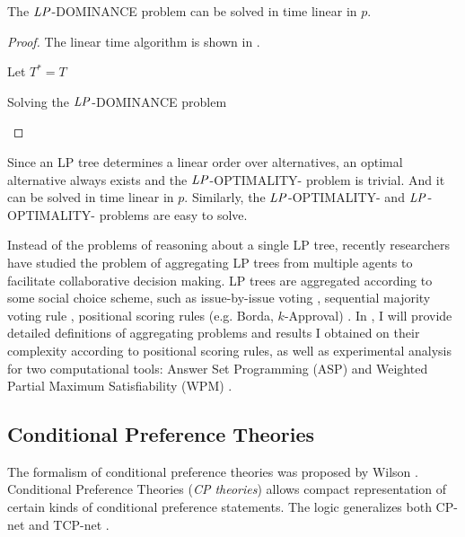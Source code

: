\begin{thm}
\label{thm:LP_DOM}
	The $\mathit{LP}$-DOMINANCE problem can be solved in time linear in $p$.
\end{thm}
\begin{proof}
	The linear time algorithm is shown in .

	\begin{algorithm}[ht]
	Let $T^* = T$\;
	
	\caption{Solving the $\mathit{LP}$-DOMINANCE problem\label{alg:LP_dom}}
	\end{algorithm}
\end{proof}

Since an LP tree determines a linear order over alternatives, an optimal
alternative always exists and the $\mathit{LP}$-OPTIMALITY- problem
is trivial.  And it can be solved in time linear in $p$.
Similarly, the $\mathit{LP}$-OPTIMALITY- and
$\mathit{LP}$-OPTIMALITY- problems are easy to solve.

Instead of the problems of reasoning about a single
LP tree, recently researchers have studied
the problem of aggregating LP trees from multiple
agents to facilitate collaborative decision making.
LP trees are aggregated
according to some social choice scheme, such as
issue-by-issue voting \cite{fargier:ibi},
sequential majority voting rule \cite{Xia:SMV},
positional scoring rules (e.g. Borda, $k$-Approval) \cite{lang,LiuT}.
In , I will provide detailed definitions of aggregating
problems and results I obtained on their complexity 
according to positional scoring rules, as
well as experimental analysis for two computational tools:
Answer Set Programming (ASP) \cite{aspataglance} and 
Weighted Partial Maximum Satisfiability (WPM) \cite{papado:b:compcomplexity}.

\subsection{Conditional Preference Theories}
The formalism of conditional preference theories was proposed by
Wilson \cite{Wilson04extendingcp-nets}.
Conditional Preference Theories (\textit{CP theories}) allows
compact representation of certain kinds of conditional preference
statements.
The logic generalizes both CP-net \cite{Wilson04extendingcp-nets} and TCP-net
\cite{WilsonECAI04}.

